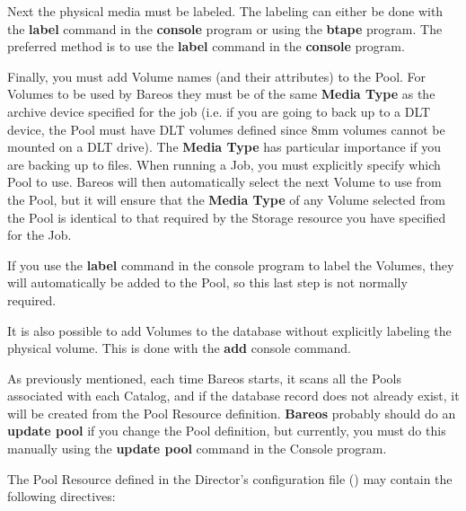 Next the physical media must be labeled. The labeling can either be done with
the {\bf label} command in the {\bf console} program or using the {\bf btape}
program. The preferred method is to use the {\bf label} command in the {\bf
console} program.

Finally, you must add Volume names (and their attributes) to the Pool. For
Volumes to be used by Bareos they must be of the same {\bf Media Type} as the
archive device specified for the job (i.e. if you are going to back up to a
DLT device, the Pool must have DLT volumes defined since 8mm volumes cannot be
mounted on a DLT drive). The {\bf Media Type} has particular importance if you
are backing up to files. When running a Job, you must explicitly specify which
Pool to use. Bareos will then automatically select the next Volume to use from
the Pool, but it will ensure that the {\bf Media Type} of any Volume selected
from the Pool is identical to that required by the Storage resource you have
specified for the Job.

If you use the {\bf label} command in the console program to label the
Volumes, they will automatically be added to the Pool, so this last step is
not normally required.

It is also possible to add Volumes to the database without explicitly labeling
the physical volume. This is done with the {\bf add} console command.

As previously mentioned, each time Bareos starts, it scans all the Pools
associated with each Catalog, and if the database record does not already
exist, it will be created from the Pool Resource definition. {\bf Bareos}
probably should do an {\bf update pool} if you change the Pool definition, but
currently, you must do this manually using the {\bf update pool} command in
the Console program.

The Pool Resource defined in the Director's configuration file
() may contain the following directives:



